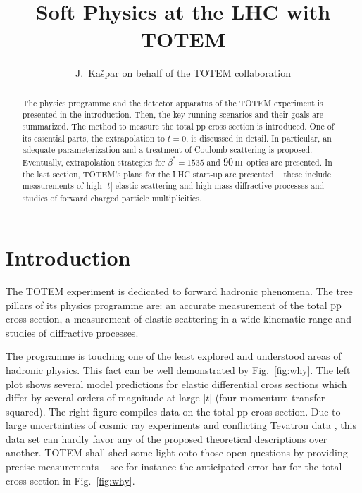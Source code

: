 \documentclass{cimento}
\def\be{\beta}
\def\un#1{\,{\rm #1}}
\begin{document}

\title{Soft Physics at the LHC with TOTEM}
\author{J.~Ka\v spar on behalf of the TOTEM collaboration}


\maketitle

\begin{abstract}
The physics programme and the detector apparatus of the TOTEM experiment is presented in the introduction. Then, the key running scenarios and their goals are summarized. The method to measure the total pp cross section is introduced. One of its essential parts, the extrapolation to $t=0$, is discussed in detail. In particular, an adequate parameterization and a treatment of Coulomb scattering is proposed. Eventually, extrapolation strategies for $\be^*=1535$ and $90\un{m}$ optics are presented. In the last section, TOTEM's plans for the LHC start-up are presented -- these include measurements of high $|t|$ elastic scattering and high-mass diffractive processes and studies of forward charged particle multiplicities.
\end{abstract}



\section{Introduction}\label{sec:intro}

The TOTEM experiment \cite{tdr,jinst,latino} is dedicated to forward hadronic phenomena. The tree pillars of its physics programme are: an accurate measurement of the total $\rm pp$ cross section, a measurement of elastic scattering in a wide kinematic range and studies of diffractive processes. 

The programme is touching one of the least explored and understood areas of hadronic physics. This fact can be well demonstrated by Fig.~\ref{fig:why}. The left plot shows several model predictions for elastic differential cross sections which differ by several orders of magnitude at large $|t|$ (four-momentum transfer squared). The right figure compiles data on the total pp cross section. Due to large uncertainties of cosmic ray experiments and conflicting Tevatron data \cite{tevatron1,tevatron2}, this data set can hardly favor any of the proposed theoretical descriptions over another. TOTEM shall shed some light onto those open questions by providing precise measurements -- see for instance the anticipated error bar for the total cross section in Fig.~\ref{fig:why}.
\end{document}
